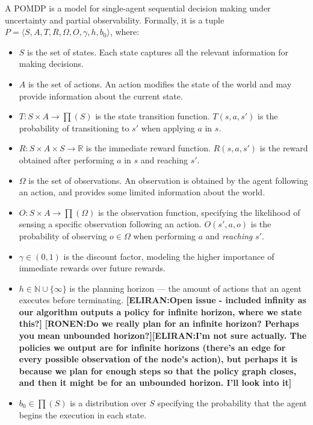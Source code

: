 \documentclass[letterpaper]{article} %
\newcommand{\eliran}[1]{\textbf{[\color{red}ELIRAN:#1]}}
\newcommand{\ronen}[1]{\textbf{[\color{blue}RONEN:#1]}}
\begin{document}
A POMDP is a model for single-agent sequential decision making under uncertainty and partial observability.
Formally, it is a tuple $P=\langle S, A, T, R, \Omega, O, \gamma, h, b_0 \rangle$, where:
\begin{itemize}
\item
$S$ is the set of states. Each state captures all the relevant information for making decisions.
\item
$A$ is the set of actions. An action modifies the state of the world and may provide information about the current state.
\item
$T: S \times A \rightarrow \prod(S)$ is the state transition function.  $T(s, a, s')$ is the probability of transitioning to $s'$ when applying $a$ in $s$. 
\item
$R:S \times A \times S \rightarrow \mathbb{R}$  is the immediate reward function. $R(s,a, s')$ is the reward obtained after performing $a$ in $s$  and reaching $s'$. 
\item
$\Omega$ is the set of observations. An observation is obtained by the agent following an action, and provides some limited information about the world.
\item
$O:S \times A \rightarrow \prod (\Omega)$ is the observation function, specifying the likelihood of sensing a specific observation following an action. $O(s', a, o)$ is the probability of observing $o\in \Omega$ when performing $a$ and \emph{reaching} $s'$. 
\item
$\gamma \in (0,1)$ is the discount factor, modeling the higher importance of immediate rewards over future rewards.
\item
$h\in\mathbb{N}\cup\{\infty\}$ is the planning horizon --- the amount of actions that an agent executes before terminating. \eliran{Open issue - included infinity as our algorithm outputs a policy for infinite horizon, where we state this?}
\ronen{Do we really plan for an infinite horizon? Perhaps you mean unbounded horizon?}\eliran{I'm not sure actually. The policies we output are for infinite horizons (there's an edge for every possible observation of the node's action), but perhaps it is because we plan for enough steps so that the policy graph closes, and then it might be for an unbounded horizon. I'll look into it}

\item
$b_0\in \prod(S)$ is a distribution over $S$ specifying the probability that the agent begins the execution in each state.
\end{itemize}
\end{document}
